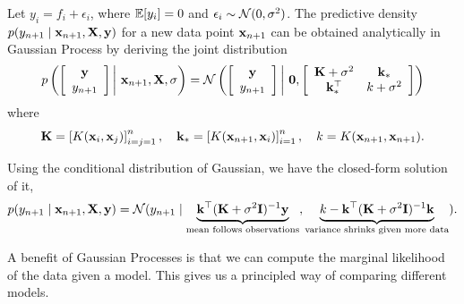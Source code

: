 \begin{definition}
Let $y_i = f_i + \epsilon_i$, where $\mathbb{E}[y_i] = 0$ and $\epsilon_i \sim \mathcal{N}(0, \sigma^2)$. The predictive density $p(y_{n + 1} \mid \mathbf{x}_{n + 1}, \mathbf{X}, \mathbf{y})$ for a new data point $\mathbf{x}_{n + 1}$ can be obtained analytically in Gaussian Process by deriving the joint distribution
$$
	p\left(\left[\begin{array}{c}
\mathbf{y} \\
y_{n+1}
\end{array}\right] \bigg|\ \mathbf{x}_{n+1}, \mathbf{X}, \sigma\right)=\mathcal{N}\left(\left[\begin{array}{c}
\mathbf{y} \\
y_{n+1}
\end{array}\right] \bigg|\ \mathbf{0},\left[\begin{array}{cc}
\mathbf{K} + \sigma^2 & \mathbf{k}_* \\
\mathbf{k}_*^{\top} & k + \sigma^2
\end{array}\right]\right)
$$	
where
$$
\mathbf{K} = \left[ K(\mathbf{x}_i, \mathbf{x}_j) \right]_{i=j=1}^{n}, \quad \mathbf{k}_* =  \left[K(\mathbf{x}_{n+1}, \mathbf{x}_i)\right]_{i=1}^{n},\quad k = K(\mathbf{x}_{n+1}, \mathbf{x}_{n+1}).
$$
\end{definition}
Using the conditional distribution of Gaussian, we have the closed-form solution of it,
\begin{equation}
	p(y_{n + 1} \mid \mathbf{x}_{n + 1}, \mathbf{X}, \mathbf{y}) = \mathcal{N}(y_{n + 1} \mid \underbrace{\mathbf{k}^\top (\mathbf{K} + \sigma^2 \mathbf{I})^{-1} \mathbf{y}}_\text{mean follows observations}, \underbrace{k -  \mathbf{k}^\top (\mathbf{K} + \sigma^2 \mathbf{I})^{-1} \mathbf{k}}_\text{variance shrinks given more data}).
\end{equation}

\begin{property}
	A benefit of Gaussian Processes is that we can compute the marginal likelihood of the data given a model. This gives us a principled way of comparing different models.
\end{property}
